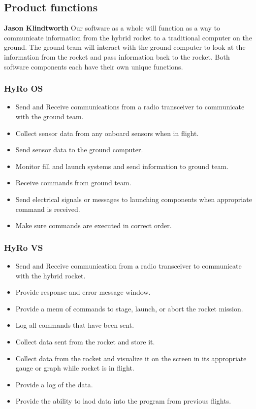 \documentclass[10pt,draftclsnofoot,onecolumn,compsoc]{IEEEtran}
\begin{document}
\subsection{ Product functions}
{\bf Jason Klindtworth}
Our software as a whole will function as a way to communicate information from the hybrid rocket to a traditional computer on the ground. The ground team will interact with the ground computer to look at the information from the rocket and pass information back to the rocket. Both software components each have their own unique functions.

\subsubsection{HyRo OS}
\begin{itemize}
\item Send and Receive communications from a radio transceiver to communicate with the ground team.
\item Collect sensor data from any onboard sensors when in flight.
\item Send sensor data to the ground computer.
\item Monitor fill and launch systems and send information to ground team.
\item Receive commands from ground team.
\item Send electrical signals or messages to launching components when appropriate command is received.
\item Make sure commands are executed in correct order.
\end{itemize}

\subsubsection{HyRo VS}
\begin{itemize}
\item Send and Receive communication from a radio transceiver to communicate with the hybrid rocket.
\item Provide response and error message window.
\item Provide a menu of commands to stage, launch, or abort the rocket mission.
\item Log all commands that have been sent.
\item Collect data sent from the rocket and store it.
\item Collect data from the rocket and visualize it on the screen in its appropriate gauge or graph while rocket is in flight.
\item Provide a log of the data.
\item Provide the ability to laod data into the program from previous flights.
\end{itemize}
\end{document}
